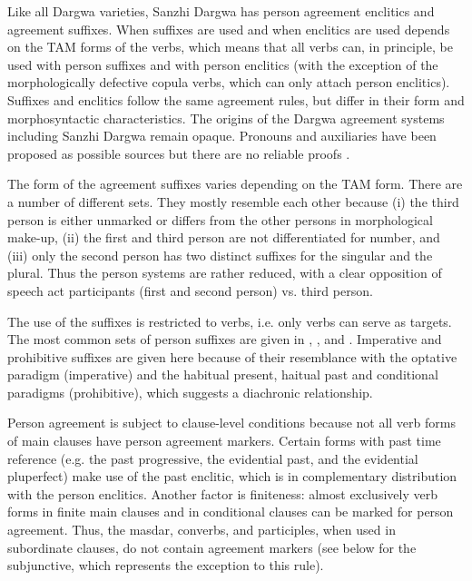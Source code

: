Like all Dargwa varieties, Sanzhi Dargwa has person agreement enclitics and agreement suffixes. When suffixes are used and when enclitics are used depends on the TAM forms of the verbs, which means that all verbs can, in principle, be used with person suffixes and with person enclitics (with the exception of the morphologically defective copula verbs, which can only attach person enclitics). Suffixes and enclitics follow the same agreement rules, but differ in their form and morphosyntactic characteristics. The origins of the Dargwa agreement systems including Sanzhi Dargwa remain opaque. Pronouns and auxiliaries have been proposed as possible sources but there are no reliable proofs \citep[147]{Sumbatova2011}.

The form of the agreement suffixes varies depending on the TAM form. There are a number of different sets. They mostly resemble each other because (i) the third person is either unmarked or differs from the other persons in morphological make-up, (ii) the first and third person are not differentiated for number, and (iii) only the second person has two distinct suffixes for the singular and the plural. Thus the person systems are rather reduced, with a clear opposition of speech act participants (first and second person) vs. third person.

The use of the suffixes is restricted to verbs, i.e. only verbs can serve as targets. The most common sets of person suffixes are given in , , and . Imperative and prohibitive suffixes are given here because of their resemblance with the optative paradigm (imperative) and the habitual present, haitual past and conditional paradigms (prohibitive), which suggests a diachronic relationship.

Person agreement is subject to clause-level conditions because not all verb forms of main clauses have person agreement markers. Certain forms with past time reference (e.g. the past progressive, the evidential past, and the evidential pluperfect) make use of the past enclitic, which is in complementary distribution with the person enclitics. Another factor is finiteness: almost exclusively verb forms in finite main clauses and in conditional clauses can be marked for person agreement. Thus, the masdar, converbs, and participles, when used in subordinate clauses, do not contain agreement markers (see  below for the subjunctive, which represents the exception to this rule).
%


